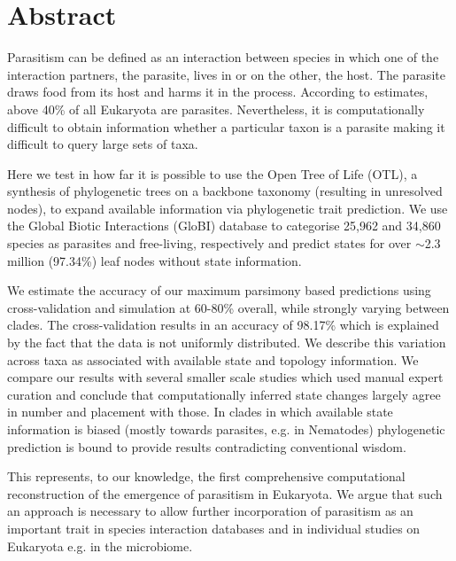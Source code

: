 \chapter*{Abstract}

  Parasitism can be defined as an interaction between species in which one of the interaction 
    partners, the parasite, lives in or on the other, the host. The parasite draws food from its 
    host and harms it in the process. According to estimates, above 40\% of all Eukaryota are 
    parasites. Nevertheless, it is computationally difficult to obtain information whether a 
    particular taxon is a parasite making it difficult to query large sets of taxa.

  Here we test in how far it is possible to use the Open Tree of Life (OTL), a synthesis of 
    phylogenetic trees on a backbone taxonomy (resulting in unresolved nodes), to expand available 
    information via phylogenetic trait prediction. We use the Global Biotic Interactions (GloBI) 
    database to categorise 25,962 and 34,860 species as parasites and free-living, respectively and 
    predict states for over $\sim$2.3 million (97.34\%) leaf nodes without state information.

  We estimate the accuracy of our maximum parsimony based predictions using cross-validation and 
    simulation at 60-80\% overall, while strongly varying between clades. The cross-validation 
    results in an accuracy of 98.17\% which is explained by the fact that the data is not uniformly 
    distributed. We describe this variation across taxa as associated with available state and 
    topology information. We compare our results with several smaller scale studies which used 
    manual expert curation and conclude that computationally inferred state changes largely agree in 
    number and placement with those. In clades in which available state information is biased 
    (mostly towards parasites, e.g. in Nematodes) phylogenetic prediction is bound to provide 
    results contradicting conventional wisdom.

  This represents, to our knowledge, the first comprehensive computational reconstruction of the 
    emergence of parasitism in Eukaryota. We argue that such an approach is necessary to allow 
    further incorporation of parasitism as an important trait in species interaction databases and 
    in individual studies on Eukaryota e.g. in the microbiome.


